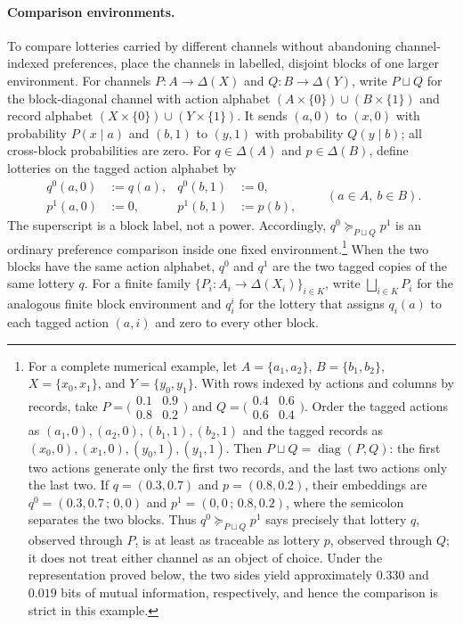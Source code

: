 \documentclass[11pt,a4paper]{article}
\theoremstyle{definition}
\newcommand{\1}{\mathbf 1}
\begin{document}
\paragraph{Comparison environments.}
To compare lotteries carried by different channels without abandoning channel-indexed preferences, place the channels in
labelled, disjoint blocks of one larger environment.  For channels $P:A\to\Delta(X)$ and $Q:B\to\Delta(Y)$, write
$P\sqcup Q$ for the block-diagonal channel with action alphabet
$(A\times\{0\})\cup(B\times\{1\})$ and record alphabet
$(X\times\{0\})\cup(Y\times\{1\})$.  It sends $(a,0)$ to $(x,0)$ with probability $P(x\mid a)$ and $(b,1)$ to $(y,1)$
with probability $Q(y\mid b)$; all cross-block probabilities are zero.  For $q\in\Delta(A)$ and
$p\in\Delta(B)$, define lotteries on the tagged action alphabet by
\[
\begin{aligned}
q^0(a,0)&:=q(a), & q^0(b,1)&:=0,\\
p^1(a,0)&:=0,    & p^1(b,1)&:=p(b),
\end{aligned}
\qquad (a\in A,\ b\in B).
\]
The superscript is a block label, not a power.  Accordingly, $q^0\succeq_{P\sqcup Q}p^1$ is an ordinary preference
comparison inside one fixed environment.\footnote{For a complete numerical example, let
$A=\{a_1,a_2\}$, $B=\{b_1,b_2\}$, $X=\{x_0,x_1\}$, and $Y=\{y_0,y_1\}$.  With rows indexed by actions and columns
by records, take
$P=\bigl(\begin{smallmatrix}0.1&0.9\\0.8&0.2\end{smallmatrix}\bigr)$ and
$Q=\bigl(\begin{smallmatrix}0.4&0.6\\0.6&0.4\end{smallmatrix}\bigr)$.
Order the tagged actions as $(a_1,0),(a_2,0),(b_1,1),(b_2,1)$ and the tagged records as
$(x_0,0),(x_1,0),(y_0,1),(y_1,1)$.  Then $P\sqcup Q=\operatorname{diag}(P,Q)$: the first two actions generate only
the first two records, and the last two actions only the last two.  If $q=(0.3,0.7)$ and $p=(0.8,0.2)$, their
embeddings are $q^0=(0.3,0.7\,;\,0,0)$ and $p^1=(0,0\,;\,0.8,0.2)$, where the semicolon separates the two blocks.  Thus
$q^0\succeq_{P\sqcup Q}p^1$ says precisely that lottery $q$, observed through $P$, is at least as traceable as lottery
$p$, observed through $Q$; it does not treat either channel as an object of choice.  Under the representation proved
below, the two sides yield approximately $0.330$ and $0.019$ bits of mutual information, respectively, and hence the
comparison is strict in this example.}
When the two blocks have the same action alphabet, $q^0$ and $q^1$ are the two tagged copies of the same lottery $q$. For a finite family
$\{P_i:A_i\to\Delta(X_i)\}_{i\in K}$, write $\bigsqcup_{i\in K}P_i$ for the analogous finite block environment and
$q_i^i$ for the lottery that assigns $q_i(a)$ to each tagged action $(a,i)$ and zero to every other block.
\end{document}
